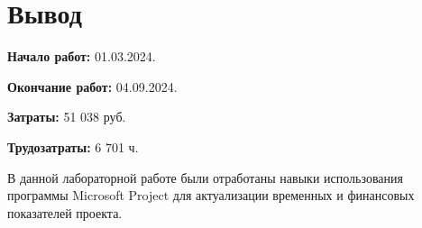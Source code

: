 \chapter*{Вывод}

\textbf{Начало работ:} 01.03.2024. 

\textbf{Окончание работ:} 04.09.2024.

\textbf{Затраты:} 51 038 руб.

\textbf{Трудозатраты:} 6 701 ч.

В данной лабораторной работе были отработаны навыки использования программы Microsoft Project для актуализации временных и финансовых показателей проекта. 